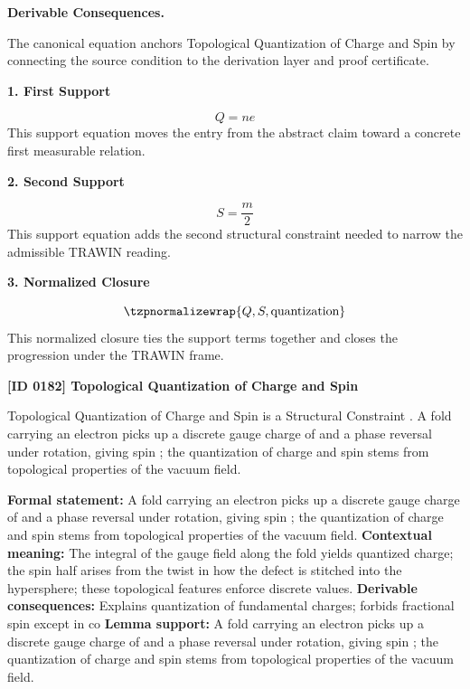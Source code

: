 \par\vspace{0.35em}
\noindent\textbf{Derivable Consequences.}\quad
\begingroup
\footnotesize
\raggedright
The canonical equation anchors Topological Quantization of Charge and Spin by connecting the source condition to the derivation layer and proof certificate.
\par\endgroup

\noindent\textbf{1. First Support}\par
\[
Q = n e
\]
\noindent This support equation moves the entry from the abstract claim toward a concrete first measurable relation.\par
\noindent\textbf{2. Second Support}\par
\[
S = \frac{m}{2}
\]
\noindent This support equation adds the second structural constraint needed to narrow the admissible TRAWIN reading.\par
\noindent\textbf{3. Normalized Closure}\par
\[
\tzpnormalizewrap{Q,S,\text{quantization}}
\]
\noindent This normalized closure ties the support terms together and closes the progression under the TRAWIN frame.\par

\clearpage
\noindent\textbf{[ID 0182] Topological Quantization of Charge and Spin}\par
\vspace{0.35em}
\begingroup\small
{}
Topological Quantization of Charge and Spin is a Structural Constraint  . A fold carrying an electron picks up a discrete gauge charge of and a phase reversal under rotation, giving spin ; the quantization of charge and spin stems from topological properties of the vacuum field.  

\begingroup\footnotesize\setlength{\emergencystretch}{3em}\sloppy
\textbf{Formal statement:} A fold carrying an electron picks up a discrete gauge charge of and a phase reversal under rotation, giving spin ; the quantization of charge and spin stems from topological properties of the vacuum field.  
\textbf{Contextual meaning:} The integral of the gauge field along the fold yields quantized charge; the spin half arises from the twist in how the defect is stitched into the hypersphere; these topological features enforce discrete values.  
\textbf{Derivable consequences:} Explains quantization of fundamental charges; forbids fractional spin except in co
\textbf{Lemma support:} A fold carrying an electron picks up a discrete gauge charge of and a phase reversal under rotation, giving spin ; the quantization of charge and spin stems from topological properties of the vacuum field.  \par
\endgroup

